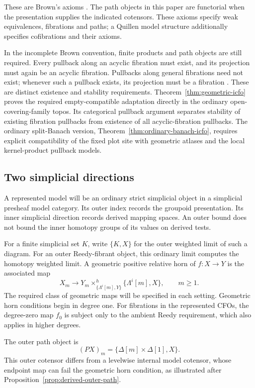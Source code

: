 \documentclass[12pt]{amsart}
\theoremstyle{definition}
\theoremstyle{remark}
\numberwithin{equation}{section}
\begin{document}
These are Brown's axioms \cite[Section~1]{Brown1973}.
The path objects in this paper are functorial when the
presentation supplies the indicated cotensors.
These axioms specify weak equivalences, fibrations and paths;
a Quillen model structure additionally specifies cofibrations
and their axioms.

In the incomplete Brown convention, finite products and path
objects are still required. Every pullback along an acyclic
fibration must exist, and its projection must again be an
acyclic fibration. Pullbacks along general fibrations need
not exist; whenever such a pullback exists, its projection
must be a fibration \cite[Definition~2.1]{RogersZhu2020}.
These are distinct existence and stability requirements.
Theorem~\ref{thm:geometric-icfo} proves the required
empty-compatible adaptation directly in the ordinary
open-covering-family topos. Its categorical pullback
argument separates stability of existing fibration
pullbacks from existence of all acyclic-fibration
pullbacks. The ordinary split-Banach version,
Theorem~\ref{thm:ordinary-banach-icfo}, requires explicit
compatibility of the fixed plot site with geometric
atlases and the local kernel-product pullback models.

\subsection{Two simplicial directions}

A represented model will be an ordinary strict simplicial
object in a simplicial presheaf model category. Its outer
index records the groupoid presentation. Its inner
simplicial direction records derived mapping spaces.
An outer bound does not bound the inner homotopy groups
of its values on derived tests.

For a finite simplicial set $K$, write $\{K,X\}$ for the
outer weighted limit of such a diagram. For an outer
Reedy-fibrant object, this ordinary limit computes the
homotopy weighted limit. A geometric positive relative
horn of $f:X\to Y$ is the associated map
\[
 X_m\longrightarrow
 Y_m\times^h_{\{\Lambda^i[m],Y\}}
                    \{\Lambda^i[m],X\},\qquad m\ge1.
\]
The required class of geometric maps will be specified
in each setting. Geometric horn conditions begin in degree
one. For fibrations in the represented CFOs, the degree-zero
map $f_0$ is subject only to the ambient Reedy requirement,
which also applies in higher degrees.

The outer path object is
\[
 (PX)_m=\{\Delta[m]\times\Delta[1],X\}.
\]
This outer cotensor differs from a levelwise internal model
cotensor, whose endpoint map can fail the geometric horn
condition, as illustrated after
Proposition~\ref{prop:derived-outer-path}.
\end{document}
